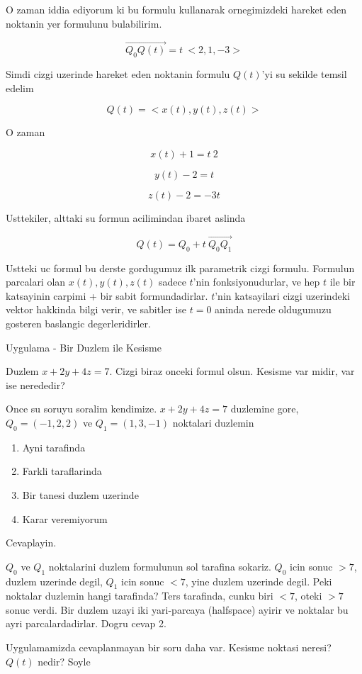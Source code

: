 \documentclass[12pt,fleqn]{article}
\begin{document}
O zaman iddia ediyorum ki bu formulu kullanarak ornegimizdeki hareket eden
noktanin yer formulunu bulabilirim.

\[ \vec{Q_0Q(t)} = t \ <2,1,-3>  \]

Simdi cizgi uzerinde hareket eden noktanin formulu $Q(t)$'yi su sekilde
temsil edelim

\[ Q(t) = <x(t),y(t),z(t)> \]

O zaman

\[ x(t) + 1 = t \ 2 \]

\[ y(t) - 2 = t \]

\[ z(t) - 2 = -3t \]

Usttekiler, alttaki su formun acilimindan ibaret aslinda

\[ Q(t) = Q_0 + t \ \vec{Q_0Q_1}  \]

Ustteki uc formul bu derste gordugumuz ilk parametrik cizgi
formulu. Formulun parcalari olan $x(t),y(t),z(t)$ sadece $t$'nin
fonksiyonudurlar, ve hep $t$ ile bir katsayinin carpimi + bir sabit
formundadirlar. $t$'nin katsayilari cizgi uzerindeki vektor hakkinda bilgi
verir, ve sabitler ise $t=0$ aninda nerede oldugumuzu gosteren baslangic
degerleridirler. 

Uygulama - Bir Duzlem ile Kesisme

Duzlem $x+2y+4z=7$. Cizgi biraz onceki formul olsun. Kesisme var midir, var
ise nerededir? 

Once su soruyu soralim kendimize. $x+2y+4z=7$ duzlemine gore, 
$Q_0 =
(-1,2,2)$ ve $Q_1 = (1,3,-1)$ noktalari duzlemin

\begin{enumerate}
   \item Ayni tarafinda
   \item Farkli taraflarinda
   \item Bir tanesi duzlem uzerinde
   \item Karar veremiyorum
\end{enumerate}

Cevaplayin. 

$Q_0$ ve $Q_1$ noktalarini duzlem formulunun sol tarafina sokariz. $Q_0$
icin sonuc $>7$, duzlem uzerinde degil, $Q_1$ icin sonuc $<7$, yine duzlem
uzerinde degil. Peki noktalar duzlemin hangi tarafinda? Ters tarafinda,
cunku biri $<7$, oteki $>7$ sonuc verdi. Bir duzlem uzayi iki yari-parcaya
(halfspace) ayirir ve noktalar bu ayri parcalardadirlar. Dogru cevap 2. 

Uygulamamizda cevaplanmayan bir soru daha var. Kesisme noktasi neresi?
$Q(t)$ nedir? Soyle
\end{document}
